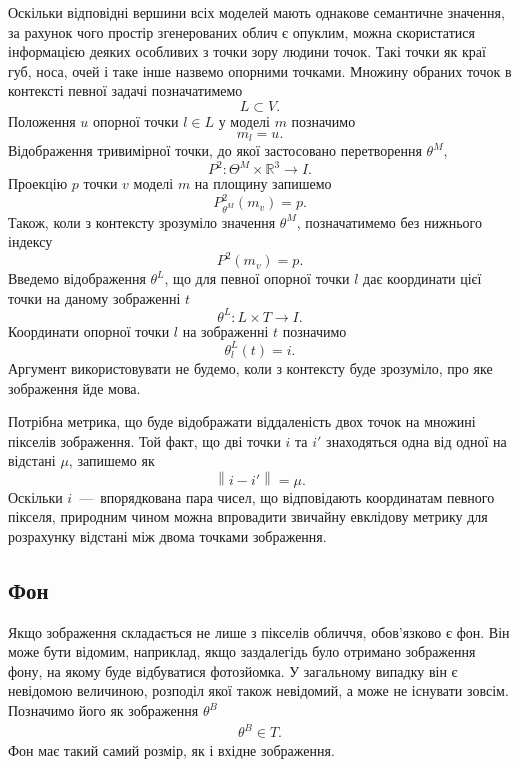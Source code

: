 Оскільки відповідні вершини всіх моделей мають однакове семантичне значення,
за рахунок чого простір згенерованих облич є опуклим,
можна скористатися інформацією деяких особливих з точки зору людини точок.
Такі точки як краї губ, носа, очей і таке інше назвемо опорними точками.
Множину обраних точок в контексті певної задачі позначатимемо
\begin{equation*}
  L \subset V.
\end{equation*}
Положення $u$ опорної точки $l \in L$ у моделі $m$ позначимо
\begin{equation*}
  m_{l} = u.
\end{equation*}
Відображення тривимірної точки,
до якої застосовано перетворення $\theta^M$,
\begin{equation*}
  P^2: \Theta^M \times \mathbb{R}^3 \rightarrow I.
\end{equation*}
Проекцію $p$ точки $v$ моделі $m$ на площину запишемо
\begin{equation*}
  P^2_{\theta^M}\left( m_v \right) = p.
\end{equation*}
Також, коли з контексту зрозуміло значення $\theta^M$,
позначатимемо без нижнього індексу
\begin{equation*}
  P^2\left( m_v \right) = p.
\end{equation*}
Введемо відображення $\theta^L$,
що для певної опорної точки $l$
дає координати цієї точки на даному зображенні $t$
\begin{equation*}
  \theta^L: L \times T \rightarrow I.
\end{equation*}
Координати опорної точки $l$ на зображенні $t$ позначимо
\begin{equation*}
  \theta_l^L\left( t \right) = i.
\end{equation*}
Аргумент використовувати не будемо, коли з контексту буде зрозуміло,
про яке зображення йде мова.

Потрібна метрика,
що буде відображати віддаленість двох точок на множині пікселів зображення.
Той факт,
що дві точки $i$ та $i'$ знаходяться одна від одної на відстані $\mu$,
запишемо як
\begin{equation*}
  \left\| i - i' \right\| = \mu.
\end{equation*}
Оскільки $i$~---~впорядкована пара чисел,
що відповідають координатам певного пікселя,
природним чином можна впровадити звичайну евклідову метрику
для розрахунку відстані між двома точками зображення.

\subsection{Фон}
Якщо зображення складається не лише з пікселів обличчя,
обов'язково є фон.
Він може бути відомим, наприклад,
якщо заздалегідь було отримано зображення фону,
на якому буде відбуватися фотозйомка.
У загальному випадку він є невідомою величиною,
розподіл якої також невідомий,
а може не існувати зовсім.
Позначимо його як зображення $\theta^B$
\begin{align*}
  \theta^B \in T.
\end{align*}
Фон має такий самий розмір, як і вхідне зображення.

